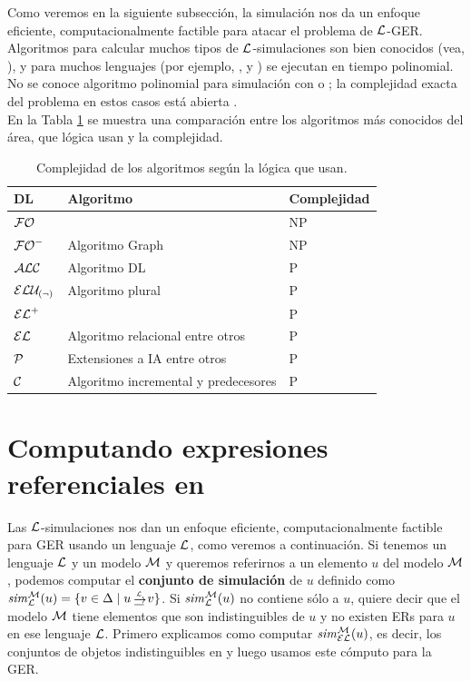 \begin{table}[t]

Como veremos en la siguiente subsecci\'on, la simulaci\'on nos da un
enfoque eficiente, computacionalmente factible para atacar el problema de $\mathcal{L}$-GER. Algoritmos para calcular muchos tipos de $\mathcal{L}$-simulaciones son
bien conocidos (vea, \cite{hopc:algo71,areces08,HHK95,dovier04:_effic_algor_for_comput_bisim_equiv}), y para muchos
lenguajes (por ejemplo, \ALC, \ELAN y \EL) se ejecutan en tiempo polinomial. No se conoce algoritmo polinomial 
 para simulaci\'on con \FOL o \EPFOL; la complejidad exacta del problema en estos casos est\'a abierta \cite{gare:comp79}.\\
En la Tabla \ref{tab:algoritmos-complejidad} se muestra una comparaci\'on entre los algoritmos m\'as conocidos del \'area, que l\'ogica usan y la complejidad.
\medskip
\begin{tabular}{|l|l|l|}
\hline
  DL & Algoritmo  & Complejidad \\  \hline
  $\mathcal{FO}$   &  																		 & NP\\ \hline
  ${\mathcal{FO}^-}$ & Algoritmo Graph \cite{graph}   & NP\\ \hline 
  $\mathcal{ALC}$   & Algoritmo DL \cite{areces08} & P\\ \hline
 	$\mathcal{ELU_{(\neg)} }$ & Algoritmo plural \cite{gardent02:_gener_minim_defin_descr} &P\\ \hline
  ${\mathcal{EL}^+}$ & &P\\ \hline
	$\mathcal{EL}$   & Algoritmo relacional \cite{Horacek1997} entre otros&P\\ \hline
	$\mathcal{P}$ &  Extensiones a IA \cite{deemter02:CL} entre otros&P\\ \hline
	$\mathcal{C}$ & Algoritmo incremental y predecesores \cite{incremental} &P\\ 
	
\hline	
\end{tabular}

\caption{Complejidad de los algoritmos seg\'un la l\'ogica que usan.}\label{tab:algoritmos-complejidad}
\end{table}


\section{Computando expresiones referenciales en \EL}\label{sec:simulation}
\label{sec:greViaSimulacion}

Las $\mathcal{L}$-simulaciones nos dan un enfoque eficiente, computacionalmente factible para GER usando un lenguaje $\mathcal{L}$, como veremos a continuaci\'on. Si tenemos un lenguaje $\mathcal{L}$ y un modelo $\mathcal{M}$ y queremos referirnos a un elemento $u$ del modelo $\mathcal{M}$, podemos computar el {\bf conjunto de simulaci\'on} de $u$ definido como
$\simset_{\+L}^{\+M}(u) = \cset{v \in \Delta \mid u \simul{\+L} v}$. Si ${\it sim}_{\mathcal{L}}^{\mathcal{M}}(u)$ no contiene s\'olo a $u$, quiere decir que el modelo $\mathcal{M}$ tiene elementos que son indistinguibles de $u$ y no existen ERs para $u$ en ese lenguaje $\mathcal{L}$.
Primero explicamos como computar ${\it sim}_{\mathcal{EL}}^{\mathcal{M}}(u)$, es decir, los conjuntos de objetos indistinguibles en \EL y luego usamos este c\'omputo para la GER.

